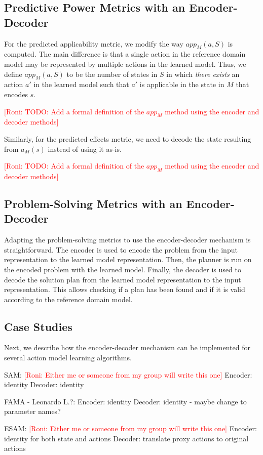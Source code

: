 \documentclass{article}
\theoremstyle{definition}
\theoremstyle{remark}
\newcommand{\app}{\ensuremath{\textit{app}}\xspace}
\newcommand{\roni}[1]{{\textcolor{red}{[Roni: #1]}}}
\begin{document}
\subsection{Predictive Power Metrics with an Encoder-Decoder}
For the predicted applicability metric, we modify the way $\app_M(a,S)$ is computed. The main difference is that a single action in the reference domain model may be represented by multiple actions in the learned model. 
Thus, we define 
$\app_M(a,S)$ to be the number of states in $S$ in which \emph{there exists} an action $a'$ in the learned model such that $a'$ is applicable in the state in $M$ that encodes $s$. 

\roni{TODO: Add a formal definition of the $app_M$ method using the encoder and decoder methods}

Similarly, for the predicted effects metric, we need to decode the state resulting from $a_M(s)$ instead of using it as-is. 

\roni{TODO: Add a formal definition of the $app_M$ method using the encoder and decoder methods}

\subsection{Problem-Solving Metrics with an Encoder-Decoder}

Adapting the problem-solving metrics to use the encoder-decoder mechanism is straightforward.
The encoder is used to encode the problem from the input representation to the learned model representation. 
Then, the planner is run on the encoded problem with the learned model. 
Finally, the decoder is used to decode the solution plan from the learned model representation to the input representation. 
This allows checking if a plan has been found and if it is valid according to the reference domain model. 


\subsection{Case Studies}
Next, we describe how the encoder-decoder mechanism can be implemented for several action model learning algorithms. 

SAM: \roni{Either me or someone from my group will write this one}
Encoder: identity
Decoder: identity

FAMA - Leonardo L.?:
Encoder: identity
Decoder: identity - maybe change to parameter names?

ESAM: \roni{Either me or someone from my group will write this one}
Encoder: identity for both state and actions     
Decoder: translate proxy actions to original actions
\end{document}

